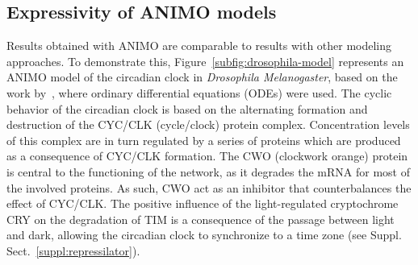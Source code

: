 \subsection{Expressivity of ANIMO models}\label{sec:animo-drosophila}
Results obtained with ANIMO are comparable to results with other modeling
approaches. To demonstrate this, Figure~\ref{subfig:drosophila-model}
represents an ANIMO model of the circadian clock in \emph{Drosophila Melanogaster}, based on the work 
by~\cite{drosophila-ode-model}, where ordinary differential equations (ODEs) were used.
The cyclic behavior of the circadian clock is based on the alternating formation and destruction of the 
CYC/CLK (cycle/clock) protein complex.
Concentration levels of this complex are in turn regulated by a series of proteins which are produced as 
a consequence of CYC/CLK formation. The CWO (clockwork orange) protein
is central to the functioning of the network, as it degrades the mRNA for most of the involved proteins. 
As such, CWO act as an inhibitor that counterbalances the effect of CYC/CLK.
The positive influence of the light-regulated cryptochrome CRY on the degradation of TIM is a consequence 
of the passage between light and dark, allowing
the circadian clock to synchronize to a time zone (see Suppl. Sect.~\ref{suppl:repressilator}).


\def\drosophilaGraphScale{0.069}%

